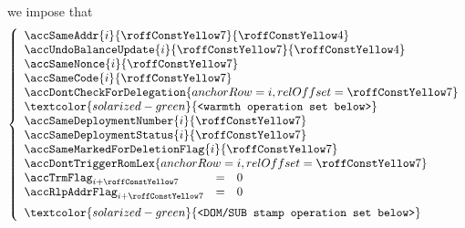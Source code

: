 \item[\underline{\underline{Second \calleeName{} account-row $n^°(i + \callSecondCalleeAccountRowOffset)$:}}]
	we impose that
	\[
		\left\{ \begin{array}{lcl}
			\multicolumn{3}{l}{\accSameAddr                   {i}{\callSecondCalleeAccountRowOffset}{\callFirstCalleeAccountRowOffset}} \\
			\multicolumn{3}{l}{\accUndoBalanceUpdate          {i}{\callSecondCalleeAccountRowOffset}{\callFirstCalleeAccountRowOffset}} \\
			\multicolumn{3}{l}{\accSameNonce                  {i}{\callSecondCalleeAccountRowOffset}} \\
			\multicolumn{3}{l}{\accSameCode                   {i}{\callSecondCalleeAccountRowOffset}} \\
			\multicolumn{3}{l}{\accDontCheckForDelegation     { anchorRow = i, relOffset = \callSecondCalleeAccountRowOffset }} \\
			\multicolumn{3}{l}{\textcolor{solarized-green}    {\texttt{<warmth operation set below>}}} \\
			\multicolumn{3}{l}{\accSameDeploymentNumber       {i}{\callSecondCalleeAccountRowOffset}} \\
			\multicolumn{3}{l}{\accSameDeploymentStatus       {i}{\callSecondCalleeAccountRowOffset}} \\
			\multicolumn{3}{l}{\accSameMarkedForDeletionFlag  {i}{\callSecondCalleeAccountRowOffset}} \\
			\multicolumn{3}{l}{\accDontTriggerRomLex          { anchorRow = i, relOffset = \callSecondCalleeAccountRowOffset }} \\
			\accTrmFlag      _{i + \callSecondCalleeAccountRowOffset} & = & 0 \\
			\accRlpAddrFlag  _{i + \callSecondCalleeAccountRowOffset} & = & 0 \vspace{2mm} \\
			\multicolumn{3}{l}{\textcolor{solarized-green}{\texttt{<DOM/SUB stamp operation set below>}}} \\
		\end{array} \right.
	\]
